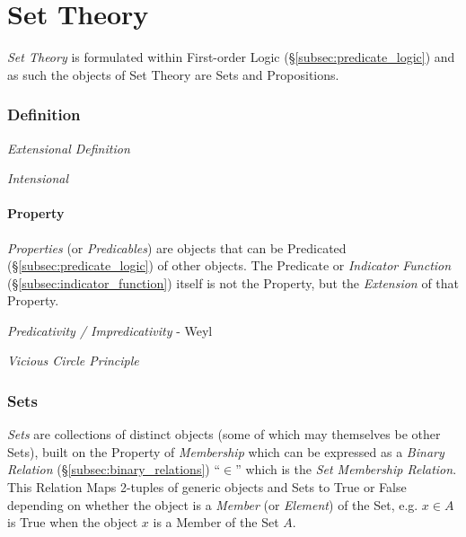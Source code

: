 \documentclass{article}
\begin{document}
\part{Set Theory}\label{sec:set_theory}

\emph{Set Theory} is formulated within First-order Logic
(\S\ref{subsec:predicate_logic}) and as such the objects of Set Theory
are Sets and Propositions.

\section{Definition}\label{sec:set_definition}

\emph{Extensional Definition}

\emph{Intensional}

\subsection{Property}\label{subsec:set_property}

\emph{Properties} (or \emph{Predicables}) are objects that can be
Predicated (\S\ref{subsec:predicate_logic}) of other objects. The
Predicate or \emph{Indicator Function}
(\S\ref{subsec:indicator_function}) itself is not the Property, but
the \emph{Extension} of that Property.

\emph{Predicativity / Impredicativity} - Weyl

\emph{Vicious Circle Principle}

\section{Sets}\label{sec:sets}

\emph{Sets} are collections of distinct objects (some of which may
themselves be other Sets), built on the Property of \emph{Membership}
which can be expressed as a \emph{Binary Relation}
(\S\ref{subsec:binary_relations}) ``$\in$'' which is the \emph{Set
  Membership Relation}. This Relation Maps 2-tuples of generic objects
and Sets to True or False depending on whether the object is a
\emph{Member} (or \emph{Element}) of the Set, e.g. $x \in A$ is True
when the object $x$ is a Member of the Set $A$.
\end{document}
